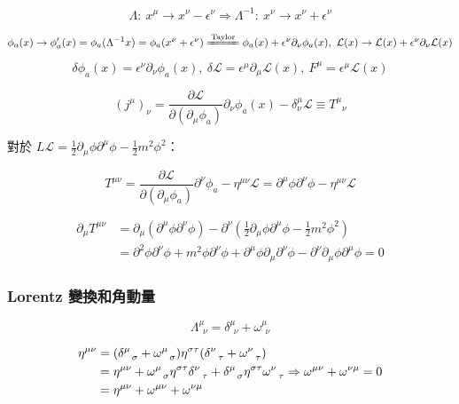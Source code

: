 \documentclass{article}
\begin{document}
$$\Lambda:\ x^{\mu}\to x^{\nu}-\epsilon^{\nu}\Rightarrow\Lambda^{-1}:\ x^{\nu}\to x^{\nu}+\epsilon^{\nu}$$

$$\phi_{a}(x)\to\phi'_{a}(x)=\phi_{a}(\Lambda^{-1}x)=\phi_{a}(x^{\nu}+\epsilon^{\nu})\xlongequal{\mathrm{Taylor}}\phi_{a}(x)+\epsilon^{\nu}\partial_{\nu}\phi_{a}(x),\ \mathcal{L}(x)\to\mathcal{L}(x)+\epsilon^{\nu}\partial_{\nu}\mathcal{L}(x)$$

$$\delta\phi_a(x)=\epsilon^{\nu}\partial_{\nu}\phi_{a}(x),\ \delta\mathcal{L}=\epsilon^{\mu}\partial_{\mu}\mathcal{L}(x),\ F^{\mu}=\epsilon^{\mu}\mathcal{L}(x)$$

$$(j^{\mu})_{\nu}=\frac{\partial\mathcal{L}}{\partial(\partial_{\mu}\phi_{a})}\partial_{\nu}\phi_{a}(x)-\delta^{\mu}_{\nu}\mathcal{L}\equiv T^{\mu}_{\ \ \ \nu}$$

對於 $L\mathcal{L}=\frac{1}{2}\partial_{\mu}\phi\partial^{\mu}\phi-\frac{1}{2}m^2\phi^2$：

$$T^{\mu\nu}=\frac{\partial\mathcal{L}}{\partial(\partial_{\mu}\phi_{a})}\partial^{\nu}\phi_{a}-\eta^{\mu\nu}\mathcal{L}=\partial^{\mu}\phi\partial^{\nu}\phi-\eta^{\mu\nu}\mathcal{L}$$

$$\begin{aligned}
    \partial_{\mu}T^{\mu\nu} & =\partial_{\mu}(\partial^{\mu}\phi\partial^{\nu}\phi)-\partial^{\nu}(\frac{1}{2}\partial_{\mu}\phi\partial^{\mu}\phi-\frac{1}{2}m^2\phi^2)                          \\
                             & =\partial^2\phi\partial^{\nu}\phi+m^2\phi\partial^{\nu}\phi+\partial^{\mu}\phi\partial_{\mu}\partial^{\nu}\phi-\partial^{\nu}\partial_{\mu}\phi\partial^{\mu}\phi=0
  \end{aligned}$$

\subsubsection{Lorentz 變換和角動量}

$$\Lambda^{\mu}_{\ \ \nu}=\delta^{\mu}_{\ \ \nu}+\omega^{\mu}_{\ \ \nu}$$

$$\begin{aligned}
    \eta^{\mu\nu} & =(\delta^{\mu}_{\ \ \sigma}+\omega^{\mu}_{\ \ \sigma})\eta^{\sigma\tau}(\delta^{\nu}_{\ \ \tau}+\omega^{\nu}_{\ \ \tau})                           \\
                  & =\eta^{\mu\nu}+\omega^{\mu}_{\ \ \sigma}\eta^{\sigma\tau}\delta^{\nu}_{\ \ \tau}+\delta^{\mu}_{\ \ \sigma}\eta^{\sigma\tau}\omega^{\nu}_{\ \ \tau} \\
                  & =\eta^{\mu\nu}+\omega^{\mu\nu}+\omega^{\nu\mu}
  \end{aligned}\\\Rightarrow\omega^{\mu\nu}+\omega^{\nu\mu}=0$$
\end{document}
